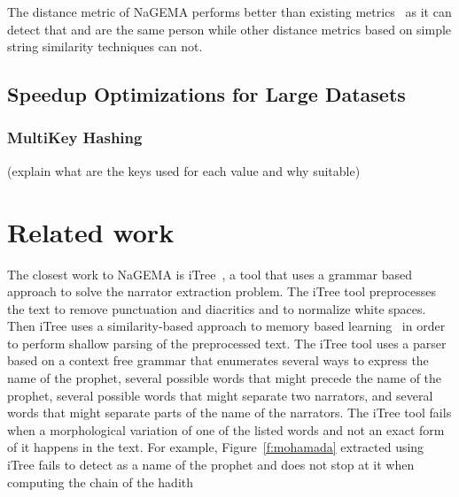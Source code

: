 \documentclass{llncs}
\begin{document}
The distance metric of NaGEMA performs better than       
existing metrics~\cite{Azmi-2010} as it can detect that  
 and  are the same person
while other distance metrics based on simple
string similarity techniques can not. 

\subsection{Speedup Optimizations for Large Datasets}

\subsubsection{MultiKey Hashing}

(explain what are the keys used for each value and why suitable)


\section{Related work }
\label{sec:related}


The closest work to NaGEMA is 
iTree~\cite{Azmi-2010,iTree}, a 
tool that uses a grammar based approach to solve 
the narrator extraction problem. 
The iTree tool preprocesses the text to remove 
punctuation and diacritics and to normalize white
spaces. 
Then iTree uses a similarity-based approach
to memory based learning~\cite{Azmi-2010} 
in order to perform 
shallow parsing of the preprocessed text. 
The iTree tool uses a parser based on a context
free grammar that enumerates several ways to express
the name of the prophet, several possible words that 
might precede the name of the prophet, several possible
words that might separate two narrators, and several
words that might separate parts of the name of 
the narrators.
The iTree tool fails when a morphological variation of 
one of the 
listed words and not an exact form of it
happens in the text. 
For example, Figure~\ref{f:mohamada} extracted 
using iTree fails to detect  as a name of the
prophet and does not stop at it when computing the chain 
of the hadith
\transfalse
{}
\transtrue
\vocalize
\end{document}
